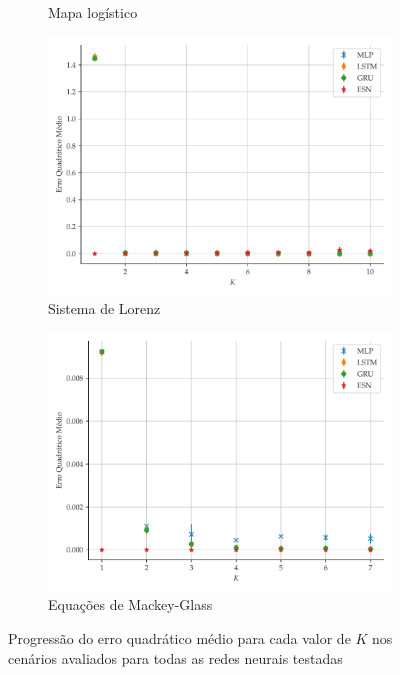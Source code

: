 \documentclass[9pt, technote]{article}
\begin{document}
\begin{figure}[H]
\begin{subfigure}[t]{0.24\textwidth}
         \caption{Mapa logístico}
     \end{subfigure}
     \centering
     \begin{subfigure}[t]{0.24\textwidth}
         \includegraphics[scale=0.24]{progressao-k-lorenz.pdf}
         \caption{Sistema de Lorenz}
     \end{subfigure}
     \centering
     \begin{subfigure}[t]{0.24\textwidth} 
         \includegraphics[scale=0.24]{progressao-k-mackeyglass.pdf}
         \caption{Equações de Mackey-Glass}
     \end{subfigure}  
     \centering   
     \caption{Progressão do erro quadrático médio para cada valor de $K$ nos cenários avaliados para todas as redes neurais testadas}
     \label{fig:mse-progression}
\end{figure}
\end{document}
